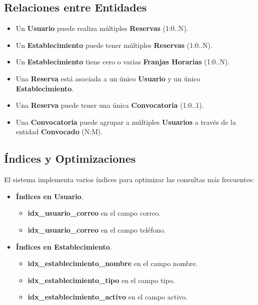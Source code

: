 \subsection{Relaciones entre Entidades}
\begin{itemize}
	\item Un \textbf{Usuario} puede realiza múltiples \textbf{Reservas} (1:0..N).
	\item Un \textbf{Establecimiento} puede tener múltiples \textbf{Reservas} (1:0..N).
	\item Un \textbf{Establecimiento} tiene cero o varias \textbf{Franjas Horarias} (1:0..N).
	\item Una \textbf{Reserva} está asociada a un único \textbf{Usuario} y un único \textbf{Establecimiento}.
	\item Una \textbf{Reserva} puede tener una única \textbf{Convocatoria} (1:0..1).
	\item Una \textbf{Convocatoria} puede agrupar a múltiples \textbf{Usuarios} a través de la entidad \textbf{Convocado} (N:M).
\end{itemize}

\newpage

\subsection{Índices y Optimizaciones}

El sistema implementa varios índices para optimizar las consultas más frecuentes:

\begin{itemize}
	\item \textbf{Índices en Usuario}.
	\begin{itemize}
       \item \textbf{idx\_usuario\_correo} en el campo correo.
       \item \textbf{idx\_usuario\_correo} en el campo teléfono.
	\end{itemize}
\end{itemize}

\begin{itemize}
	\item \textbf{Índices en Establecimiento}.
	\begin{itemize}
       \item \textbf{idx\_establecimiento\_nombre} en el campo nombre.
       \item \textbf{idx\_establecimiento\_tipo} en el campo tipo.
       \item \textbf{idx\_establecimiento\_activo} en el campo activo.
	\end{itemize}
\end{itemize}

